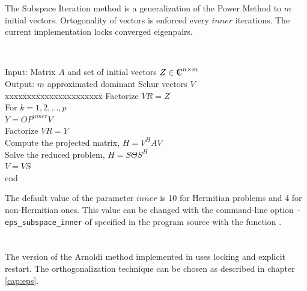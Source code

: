 The Subspace Iteration method is a generalization of the Power Method to $m$ initial vectors. Ortogonality of vectors is enforced every $inner$ iterations. The current implementation locks converged eigenpairs.

\begin{algorithm}~\rm
\begin{tabbing}
Input: Matrix $A$ and set of initial vectors $Z\in\Co^{n\times m} $\\
Output: $m$ approximated dominant Schur vectors $V$ \\
xxxx\=xxx\=xxxxxxxxxxxxxxx\=\kill
\> Factorize $VR=Z$\\
\> For $k=1,2,\ldots,p$\\
\> \> $Y=O\!P^{inner}V$ \\
\> \> Factorize $VR=Y$ \\
\> \> Compute the projected matrix, $H=V^HAV$ \\
\> \> Solve the reduced problem, $H=S\Theta S^H$ \\
\> \> $V=VS$ \\
\> end
\end{tabbing}
\end{algorithm}

The default value of the parameter $inner$ is 10 for Hermitian problems and 4 for non-Hermitian ones. This value can be changed with the command-line option \Verb!-eps_subspace_inner! of specified in the program source with the function .

\section{}

The version of the Arnoldi method implemented in \slepc uses locking and explicit restart. The orthogonalization technique can be chosen as described in chapter \ref{cap:eps}.

